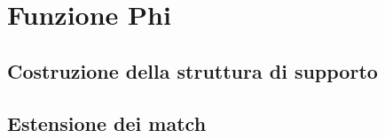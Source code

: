 \section{Funzione Phi}
\subsection{Costruzione della struttura di supporto}
\subsection{Estensione dei match}